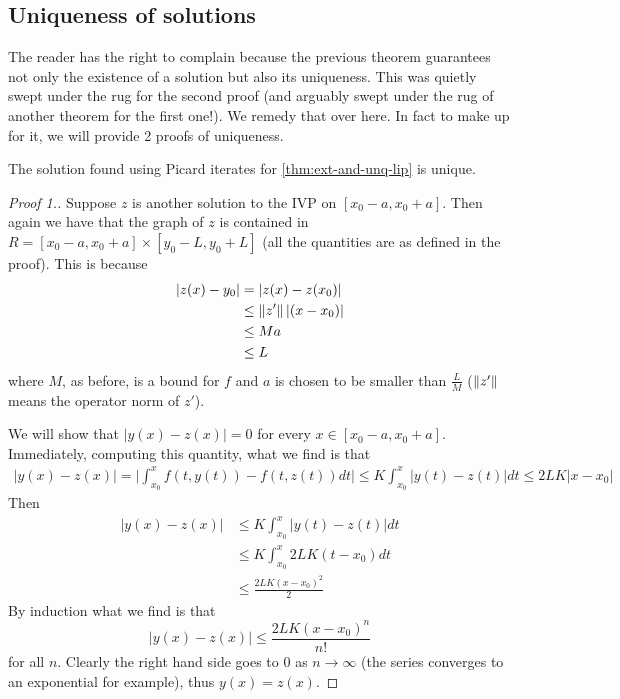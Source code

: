 \subsection{Uniqueness of solutions}
The reader has the right to complain because the previous theorem guarantees not only the existence of a solution but also its uniqueness. This was quietly swept under the rug for the second proof (and arguably swept under the rug of another theorem for the first one!). We remedy that over here. In fact to make up for it, we will provide 2 proofs of uniqueness.
\begin{proposition}
The solution found using Picard iterates for \autoref{thm:ext-and-unq-lip} is unique.
\end{proposition}
\begin{proof}[Proof 1.]
Suppose $z$ is another solution to the IVP on $[x_0 - a, x_0 + a]$. Then again we have that the graph of $z$ is contained in $R = [x_0 - a, x_0 + a] \times [y_0 - L, y_0 + L]$ (all the quantities are as defined in the proof). This is because
\begin{align*}
    |z(x) - y_0| &= |z(x) - z(x_0)| \\
    &\leq \left\lVert z'\right\rVert |(x - x_0)|\\
    &\leq M a\\
    &\leq L
\end{align*}
where $M$, as before, is a bound for $f$ and $a$ is chosen to be smaller than $\frac{L}{M}$ ($\left\lVert z'\right\rVert$ means the operator norm of $z'$).

We will show that $|y(x) - z(x)| = 0$ for every $x \in [x_0 - a, x_0 + a]$. Immediately, computing this quantity, what we find is that
\begin{align*}
    |y(x) - z(x)| = \bigg| \int_{x_0}^{x} f(t, y(t)) - f(t, z(t)) dt \bigg| \leq K \int_{x_0}^{x} |y(t) - z(t)| dt \leq 2LK |x - x_0|
\end{align*}
Then
\begin{align*}
    |y(x) - z(x)| &\leq K \int_{x_0}^{x} |y(t) - z(t)| dt\\
    &\leq K \int_{x_0}^{x} 2LK (t - x_0) dt\\
    &\leq \frac{2LK (x - x_0)^2}{2}
\end{align*}
By induction what we find is that 
$$ |y(x) - z(x)| \leq \frac{2LK (x - x_0)^n}{n!} $$
for all $n$. Clearly the right hand side goes to 0 as $n \to \infty$ (the series converges to an exponential for example), thus $y(x) = z(x)$.
\end{proof}

